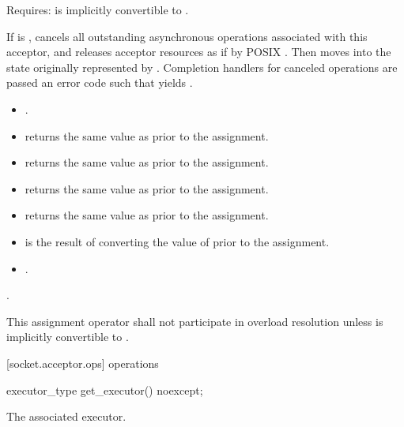 \begin{itemdescr}
\pnum
Requires:  is implicitly convertible to .

\pnum
\effects If  is , cancels all outstanding asynchronous operations associated with this acceptor, and releases acceptor resources as if by POSIX . Then moves into  the state originally represented by . Completion handlers for canceled operations are passed an error code  such that  yields .

\pnum
\postconditions 
\begin{itemize}
\item
{}.
\item
{} returns the same value as  prior to the assignment.
\item
{} returns the same value as  prior to the assignment.
\item
{} returns the same value as  prior to the assignment.
\item
{} returns the same value as  prior to the assignment.
\item
{} is the result of converting the value of  prior to the assignment.
\item
{}.
\end{itemize}

\pnum
\returns {}.

\pnum
\remarks This assignment operator shall not participate in overload resolution unless  is implicitly convertible to .
\end{itemdescr}



[socket.acceptor.ops]{ operations}

\begin{itemdecl}
executor_type get_executor() noexcept;
\end{itemdecl}

\begin{itemdescr}
\pnum
\returns The associated executor.
\end{itemdescr}

